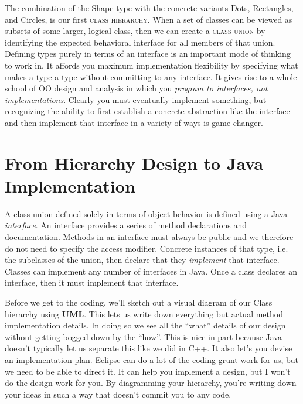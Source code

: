 \documentclass[nobib]{tufte-handout}
\begin{document}
The combination of the Shape type with the concrete variants Dots, Rectangles, and Circles, is our first \textsc{class hierarchy}.  When a set of classes can be viewed as subsets of some larger, logical class, then we can create a \textsc{class union} by identifying the expected behavioral interface for all members of that union. Defining types purely in terms of an interface is an important mode of thinking to work in. It affords you maximum implementation flexibility by specifying what makes a type a type without committing to any interface. It gives rise to a whole school of OO design and analysis in which you \textit{program to interfaces, not implementations}. Clearly you must eventually implement something, but recognizing the ability to first establish a concrete abstraction like the interface and then implement that interface in a variety of ways is game changer.


\section{From Hierarchy Design to Java Implementation}

A class union defined solely in terms of object behavior is defined using a Java \textit{interface}. An interface provides a series of method declarations and documentation. Methods in an interface must always be public and we therefore do not need to specify the access modifier. Concrete instances of that type, i.e. the subclasses of the union, then declare that they \textit{implement} that interface.  Classes can implement any number of interfaces in Java. Once a class declares an interface, then it must implement that interface.

Before we get to the coding, we'll sketch out a visual diagram of our Class hierarchy using \textbf{UML}. This lets us write down everything but actual method implementation details. In doing so we see all the ``what'' details of our design without getting bogged down by the ``how''.  This is nice in part because Java doesn't typically let us separate this like we did in C++.  It also let's you devise an implementation plan.  Eclipse can do a lot of the coding grunt work for us, but we need to be able to direct it. It can help you implement a design, but I won't do the design work for you. By diagramming your hierarchy, you're writing down your ideas in such a way that doesn't commit you to any code.
\end{document}
